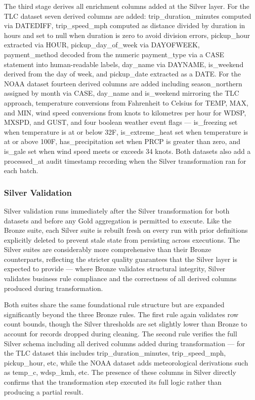 \documentclass[conference]{IEEEtran}
\begin{document}
The third stage derives all enrichment columns added at the Silver layer. For the TLC dataset seven derived columns are added: trip\_duration\_minutes computed via DATEDIFF, trip\_speed\_mph computed as distance divided by duration in hours and set to null when duration is zero to avoid division errors, pickup\_hour extracted via HOUR, pickup\_day\_of\_week via DAYOFWEEK, payment\_method decoded from the numeric payment\_type via a CASE statement into human-readable labels, day\_name via DAYNAME, is\_weekend derived from the day of week, and pickup\_date extracted as a DATE. For the NOAA dataset fourteen derived columns are added including season\_northern assigned by month via CASE, day\_name and is\_weekend mirroring the TLC approach, temperature conversions from Fahrenheit to Celsius for TEMP, MAX, and MIN, wind speed conversions from knots to kilometres per hour for WDSP, MXSPD, and GUST, and four boolean weather event flags --- is\_freezing set when temperature is at or below 32\textdegree F, is\_extreme\_heat set when temperature is at or above 100\textdegree F, has\_precipitation set when PRCP is greater than zero, and is\_gale set when wind speed meets or exceeds 34 knots. Both datasets also add a processed\_at audit timestamp recording when the Silver transformation ran for each batch.

\subsubsection{Silver Validation}

Silver validation runs immediately after the Silver transformation for both datasets and before any Gold aggregation is permitted to execute. Like the Bronze suite, each Silver suite is rebuilt fresh on every run with prior definitions explicitly deleted to prevent stale state from persisting across executions. The Silver suites are considerably more comprehensive than their Bronze counterparts, reflecting the stricter quality guarantees that the Silver layer is expected to provide --- where Bronze validates structural integrity, Silver validates business rule compliance and the correctness of all derived columns produced during transformation.

Both suites share the same foundational rule structure but are expanded significantly beyond the three Bronze rules. The first rule again validates row count bounds, though the Silver thresholds are set slightly lower than Bronze to account for records dropped during cleaning. The second rule verifies the full Silver schema including all derived columns added during transformation --- for the TLC dataset this includes trip\_duration\_minutes, trip\_speed\_mph, pickup\_hour, etc, while the NOAA dataset adds meteorological derivations such as temp\_c, wdsp\_kmh, etc. The presence of these columns in Silver directly confirms that the transformation step executed its full logic rather than producing a partial result.
\end{document}
